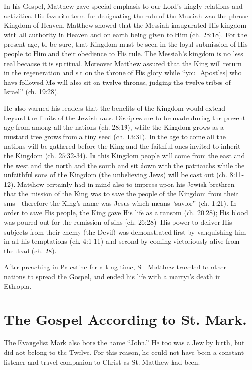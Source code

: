 In his Gospel, Matthew gave special emphasis to our Lord's kingly relations and activities. His favorite term for designating the rule of the Messiah was the phrase Kingdom of Heaven. Matthew showed that the Messiah inaugurated His kingdom with all authority in Heaven and on earth being given to Him (ch. 28:18). For the present age, to be sure, that Kingdom must be seen in the loyal submission of His people to Him and their obedience to His rule. The Messiah's kingdom is no less real because it is spiritual. Moreover Matthew assured that the King will return in the regeneration and sit on the throne of His glory while ``you [Apostles] who have followed Me will also sit on twelve thrones, judging the twelve tribes of Israel'' (ch. 19:28).

He also warned his readers that the benefits of the Kingdom would extend beyond the limits of the Jewish race. Disciples are to be made during the present age from among all the nations (ch. 28:19), while the Kingdom grows as a mustard tree grows from a tiny seed (ch. 13:31). In the age to come all the nations will be gathered before the King and the faithful ones invited to inherit the Kingdom (ch. 25:32-34). In this Kingdom people will come from the east and the west and the north and the south and sit down with the patriarchs while the unfaithful sons of the Kingdom (the unbelieving Jews) will be cast out (ch. 8:11-12). Matthew certainly had in mind also to impress upon his Jewish brethren that the mission of the King was to save the people of the Kingdom from their sins---therefore the King's name was Jesus which means ``savior'' (ch. 1:21). In order to save His people, the King gave His life as a ransom (ch. 20:28); His blood was poured out for the remission of sins (ch. 26:28). His power to deliver His subjects from their enemy (the Devil) was demonstrated first by vanquishing him in all his temptations (ch. 4:1-11) and second by coming victoriously alive from the dead (ch. 28).

After preaching in Palestine for a long time, St. Matthew traveled to other nations to spread the Gospel, and ended his life with a martyr's death in Ethiopia.

\section{The Gospel According to St. Mark.}

The Evangelist Mark also bore the name ``John.'' He too was a Jew by birth, but did not belong to the Twelve. For this reason, he could not have been a constant listener and travel companion to Christ as St. Matthew had been.

